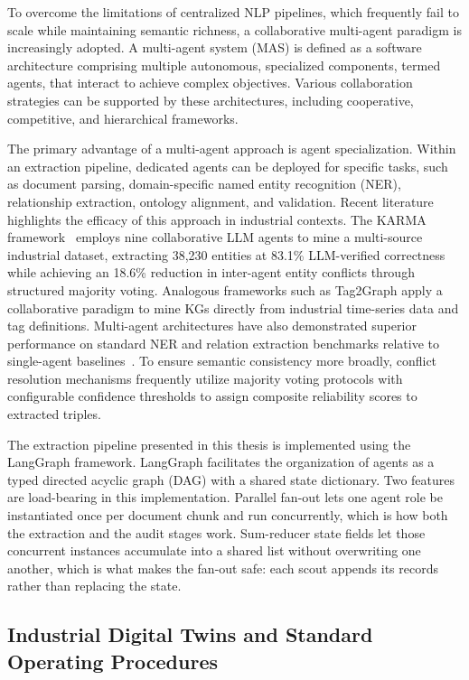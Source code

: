 \documentclass[11pt]{article}
\begin{document}
To overcome the limitations of centralized NLP pipelines, which frequently fail to scale while maintaining semantic richness, a collaborative multi-agent paradigm is increasingly adopted. A multi-agent system (MAS) is defined as a software architecture comprising multiple autonomous, specialized components, termed agents, that interact to achieve complex objectives. Various collaboration strategies can be supported by these architectures, including cooperative, competitive, and hierarchical frameworks. 

The primary advantage of a multi-agent approach is agent specialization. Within an extraction pipeline, dedicated agents can be deployed for specific tasks, such as document parsing, domain-specific named entity recognition (NER), relationship extraction, ontology alignment, and validation. Recent literature highlights the efficacy of this approach in industrial contexts. The KARMA framework~\cite{lu2025karma} employs nine collaborative LLM agents to mine a multi-source industrial dataset, extracting 38,230 entities at 83.1\% LLM-verified correctness while achieving an 18.6\% reduction in inter-agent entity conflicts through structured majority voting. Analogous frameworks such as Tag2Graph apply a collaborative paradigm to mine KGs directly from industrial time-series data and tag definitions. Multi-agent architectures have also demonstrated superior performance on standard NER and relation extraction benchmarks relative to single-agent baselines~\cite{chen2024multiagent}. To ensure semantic consistency more broadly, conflict resolution mechanisms frequently utilize majority voting protocols with configurable confidence thresholds to assign composite reliability scores to extracted triples.

The extraction pipeline presented in this thesis is implemented using the LangGraph framework. LangGraph facilitates the organization of agents as a typed directed acyclic graph (DAG) with a shared state dictionary. Two features are load-bearing in this implementation. Parallel fan-out lets one agent role be instantiated once per document chunk and run concurrently, which is how both the extraction and the audit stages work. Sum-reducer state fields let those concurrent instances accumulate into a shared list without overwriting one another, which is what makes the fan-out safe: each scout appends its records rather than replacing the state.

\subsection{Industrial Digital Twins and Standard Operating Procedures}
\label{sec:bg_dt}
\end{document}
